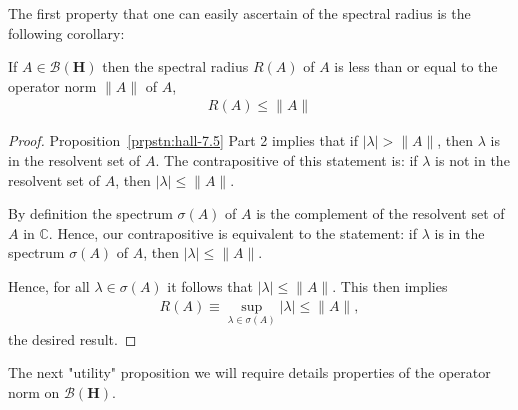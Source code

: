 The first property that one can easily ascertain of the spectral radius is the following corollary:

\begin{corollary}
    \label{crllr:crllr-1}
    \leanok
    If $A \in \mathcal{B}(\mathbf{H})$ then the spectral radius $R(A)$ of $A$ is less than or equal to the operator norm $\|A\|$ of $A$,
    \begin{align}
        R(A) \le \|A\|
    \end{align}
\end{corollary}
\begin{proof}
    \leanok
Proposition~\ref{prpstn:hall-7.5} Part 2 implies that if $\lvert \lambda \rvert > \|A\|$, then $\lambda$ is in the resolvent set of $A$. The contrapositive of this statement is: if $\lambda$ is not in the resolvent set of $A$, then $\lvert \lambda \rvert \le \|A\|$.

By definition the spectrum $\sigma(A)$ of $A$ is the complement of the resolvent set of $A$ in $\mathbb{C}$. Hence, our contrapositive is equivalent to the statement: if $\lambda$ is in the spectrum $\sigma(A)$ of $A$, then $\lvert \lambda \rvert \le \|A\|$.

Hence, for all $\lambda \in \sigma(A)$ it follows that $\lvert \lambda \rvert \le \|A\|$. This then implies
\begin{align}
    R(A) \equiv \sup\limits_{\lambda \in \sigma(A)} \lvert \lambda \rvert \le \|A\|,
\end{align}
the desired result.
\end{proof}

The next "utility" proposition we will require details properties of the operator norm on $\mathcal{B}(\mathbf{H})$.

